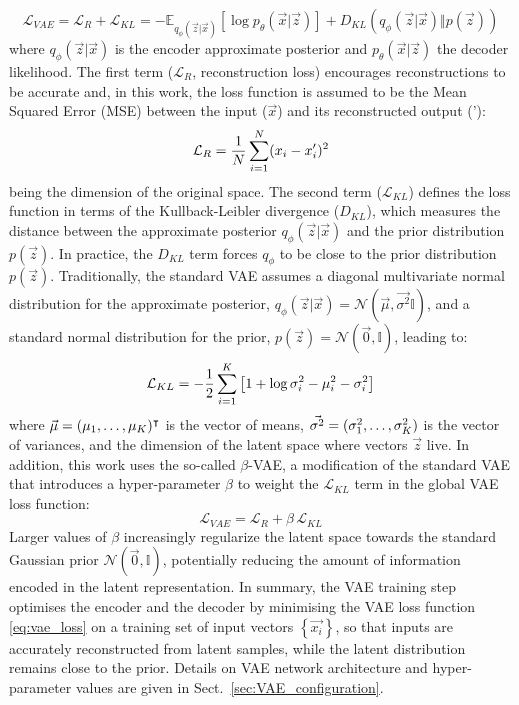 \begin{equation}
  \mathcal{L}_{VAE} = \mathcal{L}_R + \mathcal{L}_{KL} =-\mathbb{E}_{q_{\phi}(\vec{z}\vert\vec{x})}
  \left[ \log p_{\theta}(\vec{x} \vert \vec{z}) \right] + 
  D_{KL} \left( q_{\phi}(\vec{z}\vert\vec{x}) \Vert p(\vec{z}) \right)
\label{eq:L_vae}
\end{equation}
where $q_{\phi}(\vec{z}\vert\vec{x})$ is the encoder approximate posterior and $p_{\theta}(\vec{x} \vert \vec{z})$ the decoder likelihood. The first term ($\mathcal{L}_R$, reconstruction loss) encourages reconstructions to be accurate and, in this work, the loss function is assumed to be the Mean Squared Error (MSE) between the input ($\vec{x}$) and its reconstructed output ('):
\begin{equation}
  \mathcal{L}_R = \dfrac{1}{N} \sum_{i=1}^{N} (x_i - x'_i)^2
\end{equation}
being \spaceDim the dimension of the original space. The second term ($\mathcal{L}_{KL}$) defines the loss function in terms of the Kullback-Leibler divergence ($D_{KL}$), which measures the distance between the approximate posterior $q_{\phi}(\vec{z} \vert \vec{x})$ and the prior distribution $p(\vec{z})$. In practice, the $D_{KL}$ term forces $q_{\phi}$ to be close to the prior distribution $p(\vec{z})$. Traditionally, the standard VAE assumes a diagonal multivariate normal distribution for the approximate posterior, $q_{\phi}(\vec{z} \vert \vec{x}) = \mathcal {N}(\vec{\mu}, \vec{\sigma^2} \mathbb{I} )$, and a standard normal distribution for the prior, $p(\vec{z}) = \mathcal {N}(\vec{0},\mathbb{I})$, leading to:
%
\begin{equation}
  \mathcal{L}_{KL} = -\dfrac{1}{2} \sum_{i=1}^K \left[1+\log \sigma_i^2 - \mu_i^2 - \sigma_i^2 \right]
\end{equation}
%
where $\vec{\mu} = (\mu_1,\dots,\mu_K)^{\intercal}$ is the vector of means, $\vec{\sigma^2} = (\sigma_1^2,\dots,\sigma_K^2)$ is the vector of variances, and \latentDim the dimension of the latent space where vectors $\vec{z}$ live. In addition, this work uses the so-called $\beta$-VAE, a modification of the standard VAE that introduces a hyper-parameter $\beta$ to weight the $\mathcal{L}_{KL}$ term in the global VAE loss function:
%
\begin{equation}
  \mathcal{L}_{VAE} = \mathcal{L}_R + \beta \, \mathcal{L}_{KL}
  \label{eq:vae_loss}
\end{equation}
Larger values of $\beta$ increasingly regularize the latent space towards the standard Gaussian prior $\mathcal{N}(\vec{0},\mathbb{I})$, potentially reducing the amount of information encoded in the latent representation. In summary, the VAE training step optimises the encoder and the decoder by minimising the VAE loss function \eqref{eq:vae_loss} on a training set of input vectors $\left\{ \vec{x_i} \right\}$, so that inputs are accurately reconstructed from latent samples, while the latent distribution remains close to the prior. Details on VAE network architecture and hyper-parameter values are given in Sect.~\ref{sec:VAE_configuration}.
